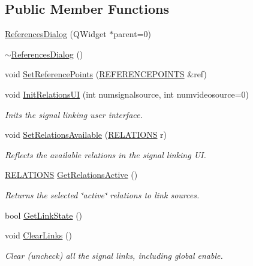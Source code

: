 \subsection*{Public Member Functions}
\begin{CompactItemize}
\item 
\hyperlink{class_references_dialog_1f3990e5a3cd494c4094c77378059ddd}{ReferencesDialog} (QWidget $\ast$parent=0)
\item 
\hyperlink{class_references_dialog_ad24575b5bd4faab98827b988a562811}{$\sim$ReferencesDialog} ()
\item 
void \hyperlink{class_references_dialog_d085c5bc795c22f77d91646b83d80980}{SetReferencePoints} (\hyperlink{data_8h_7b296bba56ab2e0ad6167aadcafe80d2}{REFERENCEPOINTS} \&ref)
\item 
void \hyperlink{class_references_dialog_bbb001e60a9a5427fdccc08bc6877cb2}{InitRelationsUI} (int numsignalsource, int numvideosource=0)
\begin{CompactList}\small\item\em Inits the signal linking user interface. \item\end{CompactList}\item 
void \hyperlink{class_references_dialog_07d39aeb362342ef4be3cc1f364a5e5d}{SetRelationsAvailable} (\hyperlink{data_8h_4b97445fb0d920ec53954c1420f3217c}{RELATIONS} r)
\begin{CompactList}\small\item\em Reflects the available relations in the signal linking UI. \item\end{CompactList}\item 
\hyperlink{data_8h_4b97445fb0d920ec53954c1420f3217c}{RELATIONS} \hyperlink{class_references_dialog_ee8ef020f8207cdbc20fe135a6e484ea}{GetRelationsActive} ()
\begin{CompactList}\small\item\em Returns the selected \char`\"{}active\char`\"{} relations to link sources. \item\end{CompactList}\item 
bool \hyperlink{class_references_dialog_8f0db69f00d805371a0f96a8fa5b1325}{GetLinkState} ()
\item 
void \hyperlink{class_references_dialog_b00305898821b7a93bdf16ada070e65e}{ClearLinks} ()
\begin{CompactList}\small\item\em Clear (uncheck) all the signal links, including global enable. \item\end{CompactList}\end{CompactItemize}
